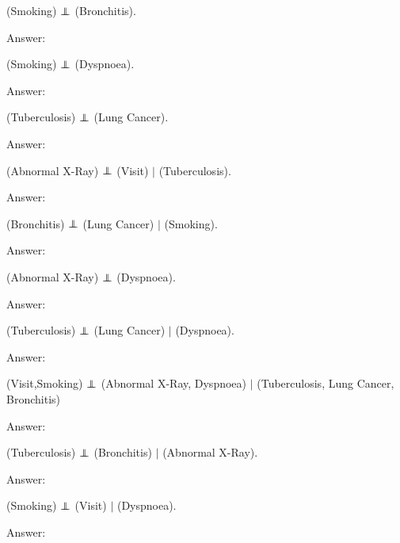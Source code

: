 \documentclass{article}
\newenvironment{answer}{\par\begingroup\color{answer}Answer: }{\endgroup}
\newcommand{\TODO}{\color{red}{TODO}}
\newcommand\indep{\protect\mathpalette{\protect\indeP}{\perp}}
\def\indeP#1#2{\mathrel{\rlap{$#1#2$}\mkern2mu{#1#2}}}
\begin{document}
\begin{qlist}
\item (Smoking) $\indep$ (Bronchitis).
\begin{answer}\TODO\end{answer}

\item (Smoking) $\indep$ (Dyspnoea).
\begin{answer}\TODO\end{answer}

\item (Tuberculosis) $\indep$ (Lung Cancer).
\begin{answer}\TODO\end{answer}

\item (Abnormal X-Ray) $\indep$ (Visit) $|$ (Tuberculosis).
\begin{answer}\TODO\end{answer}

\item (Bronchitis) $\indep$ (Lung Cancer) $|$ (Smoking).
\begin{answer}\TODO\end{answer}

\item (Abnormal X-Ray) $\indep$ (Dyspnoea).
\begin{answer}\TODO\end{answer}

\item (Tuberculosis) $\indep$ (Lung Cancer) $|$ (Dyspnoea).
\begin{answer}\TODO\end{answer}

\item (Visit,Smoking) $\indep$ (Abnormal X-Ray, Dyspnoea) $|$ (Tuberculosis, Lung Cancer, Bronchitis)
\begin{answer}\TODO\end{answer}

\item (Tuberculosis) $\indep$ (Bronchitis) $|$ (Abnormal X-Ray).
\begin{answer}\TODO\end{answer}

\item (Smoking) $\indep$ (Visit) $|$ (Dyspnoea).
\begin{answer}\TODO\end{answer}
\end{qlist}
\end{document}
